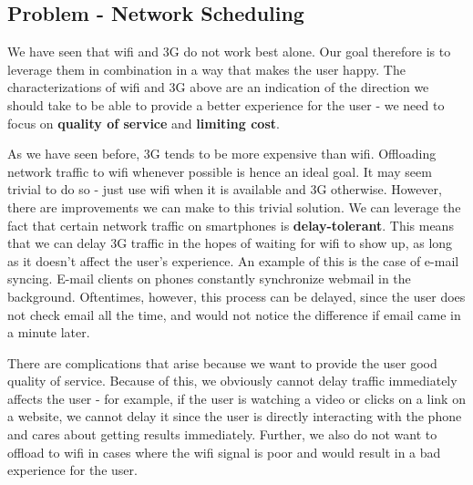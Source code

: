 \documentclass[12pt, fleqn]{article}
\begin{document}


\subsection{Problem - Network Scheduling}

We have seen that wifi and 3G do not work best alone. Our goal therefore is to 
leverage them in combination in a way that makes the user happy. The characterizations 
of wifi and 3G above are an indication of the direction we should take to be able to 
provide a better experience for the user - we need to focus on \textbf{quality of service} 
and \textbf{limiting cost}. 

As we have seen before, 3G tends to be more expensive than wifi. 
Offloading network traffic to wifi whenever possible is hence an ideal goal. It 
may seem trivial to do so - just use wifi when it is available and 3G otherwise.
However, there are improvements we can make to this trivial solution. 
We can leverage the fact that certain network traffic on 
smartphones is \textbf{delay-tolerant}. This means that we can delay 3G traffic in the 
hopes of waiting for wifi to show up, as long as it doesn't affect the user's 
experience. An example of this is 
the case of e-mail syncing. E-mail clients on phones constantly synchronize webmail in the 
background. Oftentimes, however, this process can be delayed, since the user does not 
check email all the time, and would not notice the difference if email came in a minute later.

There are complications that arise because we want to provide the user good 
quality of service. Because of this, we obviously cannot delay traffic 
immediately affects the user - for example, if the user is watching a video or clicks on a link on
a website, we cannot delay it since the user is directly interacting with the 
phone and cares about getting results immediately. Further, we also do not want 
to offload to wifi in cases where the wifi signal is poor and would result in a 
bad experience for the user.
\end{document}
